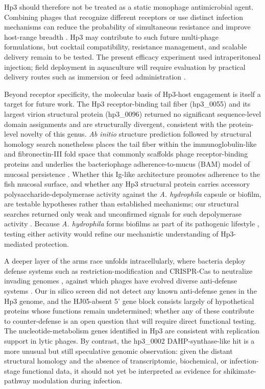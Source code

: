 Hp3 should therefore not be treated as a static monophage antimicrobial
agent. Combining phages that recognize different receptors or use
distinct infection mechanisms can reduce the probability of simultaneous
resistance and improve host-range breadth \citep{2021-Phage_Abedon,
2023-Developing_Oromi-Bosch}. Hp3 may contribute to such future
multi-phage formulations, but cocktail compatibility, resistance
management, and scalable delivery remain to be tested. The present
efficacy experiment used intraperitoneal injection; field deployment in
aquaculture will require evaluation by practical delivery routes such as
immersion or feed administration \citep{2021-Phage_Ramos-Vivas}.

Beyond receptor specificity, the molecular basis of Hp3-host engagement
is itself a target for future work. The Hp3 receptor-binding tail fiber
(hp3\_0055) and its largest virion structural protein (hp3\_0096)
returned no significant sequence-level domain assignments and are
structurally divergent, consistent with the protein-level novelty of
this genus. \emph{Ab initio} structure prediction followed by structural
homology search nonetheless places the tail fiber within the
immunoglobulin-like and fibronectin-III fold space that commonly
scaffolds phage receptor-binding proteins and underlies the
bacteriophage adherence-to-mucus (BAM) model of mucosal persistence
\citep{2013-Bacteriophage_Barr, 2006-IgLike_Fraser, 2024-Bacteriophage_Wu}.
Whether this Ig-like architecture promotes adherence to the fish mucosal
surface, and whether any Hp3 structural protein carries accessory
polysaccharide-depolymerase activity against the \emph{A. hydrophila}
capsule or biofilm, are testable hypotheses rather than established
mechanisms; our structural searches returned only weak and unconfirmed
signals for such depolymerase activity \citep{2016-Bacteriophageencoded_Pires,
2023-Potential_Guo}. Because \emph{A. hydrophila} forms biofilms as part
of its pathogenic lifestyle \citep{2024-Tad_Tekedar}, testing either
activity would refine our mechanistic understanding of Hp3-mediated
protection.

A deeper layer of the arms race unfolds intracellularly, where bacteria
deploy defense systems such as restriction-modification and CRISPR-Cas
to neutralize invading genomes \citep{2010-Bacteriophage_Labrie},
against which phages have evolved diverse anti-defense systems
\citep{2024-Growing_Murtazalieva}. Our in silico screen did not detect
any known anti-defense genes in the Hp3 genome, and the HJ05-absent 5'
gene block consists largely of hypothetical proteins whose functions
remain undetermined; whether any of these contribute to counter-defense
is an open question that will require direct functional testing. The
nucleotide-metabolism genes identified in Hp3 are consistent with
replication support in lytic phages. By contrast, the hp3\_0002
DAHP-synthase-like hit is a more unusual but still speculative genomic
observation: given the distant structural homology and the absence of
transcriptomic, biochemical, or infection-stage functional data, it
should not yet be interpreted as evidence for shikimate-pathway
modulation during infection.

